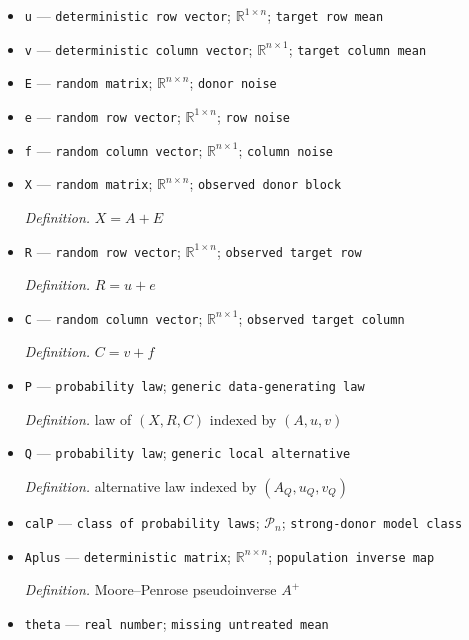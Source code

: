 \documentclass{article}
\begin{document}
\begin{itemize}
  \par\smallskip\noindent\emph{Definition.} compact right singular-vector matrix of \(A\)
  \item \texttt{u} --- \texttt{deterministic row vector}; \(\mathbb R^{1\times n}\); \texttt{target row mean}
  \item \texttt{v} --- \texttt{deterministic column vector}; \(\mathbb R^{n\times1}\); \texttt{target column mean}
  \item \texttt{E} --- \texttt{random matrix}; \(\mathbb R^{n\times n}\); \texttt{donor noise}
  \item \texttt{e} --- \texttt{random row vector}; \(\mathbb R^{1\times n}\); \texttt{row noise}
  \item \texttt{f} --- \texttt{random column vector}; \(\mathbb R^{n\times1}\); \texttt{column noise}
  \item \texttt{X} --- \texttt{random matrix}; \(\mathbb R^{n\times n}\); \texttt{observed donor block}
  \par\smallskip\noindent\emph{Definition.} \(X=A+E\)
  \item \texttt{R} --- \texttt{random row vector}; \(\mathbb R^{1\times n}\); \texttt{observed target row}
  \par\smallskip\noindent\emph{Definition.} \(R=u+e\)
  \item \texttt{C} --- \texttt{random column vector}; \(\mathbb R^{n\times1}\); \texttt{observed target column}
  \par\smallskip\noindent\emph{Definition.} \(C=v+f\)
  \item \texttt{P} --- \texttt{probability law}; \texttt{generic data-\allowbreak{}generating law}
  \par\smallskip\noindent\emph{Definition.} law of \((X,R,C)\) indexed by \((A,u,v)\)
  \item \texttt{Q} --- \texttt{probability law}; \texttt{generic local alternative}
  \par\smallskip\noindent\emph{Definition.} alternative law indexed by \((A_Q,u_Q,v_Q)\)
  \item \texttt{calP} --- \texttt{class of probability laws}; \(\mathcal P_n\); \texttt{strong-\allowbreak{}donor model class}
  \item \texttt{Aplus} --- \texttt{deterministic matrix}; \(\mathbb R^{n\times n}\); \texttt{population inverse map}
  \par\smallskip\noindent\emph{Definition.} Moore--Penrose pseudoinverse \(A^+\)
  \item \texttt{theta} --- \texttt{real number}; \texttt{missing untreated mean}

\end{itemize}
\end{document}
